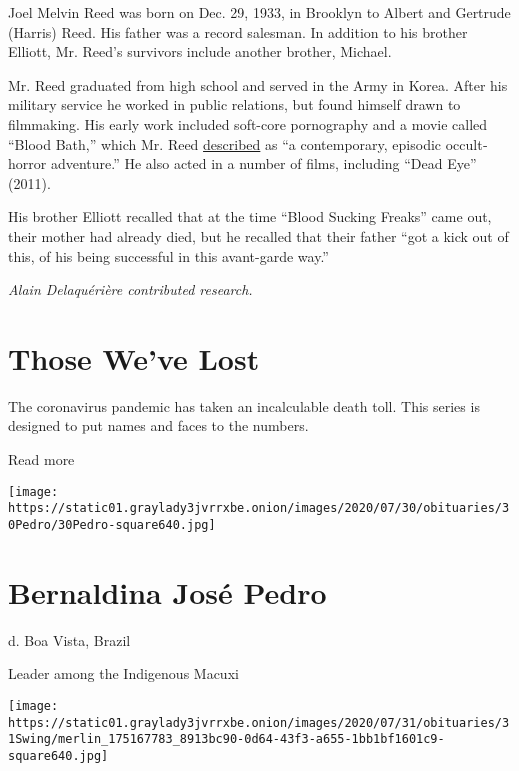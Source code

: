 Joel Melvin Reed was born on Dec. 29, 1933, in Brooklyn to Albert and
Gertrude (Harris) Reed. His father was a record salesman. In addition to
his brother Elliott, Mr. Reed's survivors include another brother,
Michael.

Mr. Reed graduated from high school and served in the Army in Korea.
After his military service he worked in public relations, but found
himself drawn to filmmaking. His early work included soft-core
pornography and a movie called ``Blood Bath,'' which Mr. Reed
\href{https://www.nytimes3xbfgragh.onion/1974/04/28/archives/news-of-the-screen-greece-is-subject-of-a-new-dassin-shooting.html}{described}
as ``a contemporary, episodic occult‐horror adventure.'' He also acted
in a number of films, including ``Dead Eye'' (2011).

His brother Elliott recalled that at the time ``Blood Sucking Freaks''
came out, their mother had already died, but he recalled that their
father ``got a kick out of this, of his being successful in this
avant-garde way.''

\emph{Alain Delaquérière contributed research.}

\href{https://www.nytimes3xbfgragh.onion/interactive/2020/obituaries/people-died-coronavirus-obituaries.html?action=click\&pgtype=Article\&state=default\&region=BELOW_MAIN_CONTENT\&context=covid_obits_promo}{}

\hypertarget{those-weve-lost}{%
\section{Those We've Lost}\label{those-weve-lost}}

The coronavirus pandemic has taken an incalculable death toll. This
series is designed to put names and faces to the numbers.

Read more

\texttt{[image: https://static01.graylady3jvrrxbe.onion/images/2020/07/30/obituaries/30Pedro/30Pedro-square640.jpg]}

\hypertarget{bernaldina-josuxe9-pedro}{%
\section{Bernaldina José Pedro}\label{bernaldina-josuxe9-pedro}}

d. Boa Vista, Brazil

Leader among the Indigenous Macuxi

\texttt{[image: https://static01.graylady3jvrrxbe.onion/images/2020/07/31/obituaries/31Swing/merlin\_175167783\_8913bc90-0d64-43f3-a655-1bb1bf1601c9-square640.jpg]}

